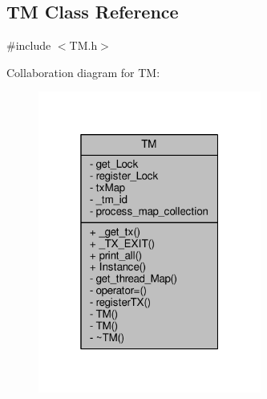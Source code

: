 \hypertarget{class_t_m}{}\subsection{TM Class Reference}
\label{class_t_m}


{\ttfamily \#include $<$T\+M.\+h$>$}



Collaboration diagram for TM\+:\nopagebreak
\begin{figure}[H]
\begin{center}
\leavevmode
\includegraphics[width=208pt]{class_t_m__coll__graph}
\end{center}
\end{figure}
